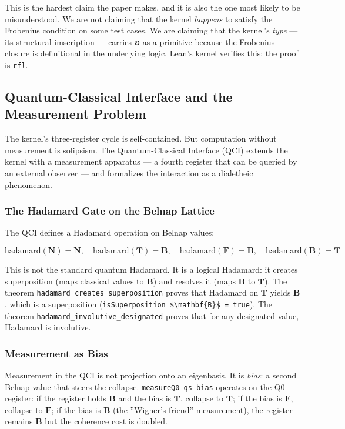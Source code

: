 \documentclass[10pt,a4paper]{article}
\begin{document}
This is the hardest claim the paper makes, and it is also the one most likely to be misunderstood. We are not claiming that the kernel \emph{happens} to satisfy the Frobenius condition on some test cases. We are claiming that the kernel's \emph{type} --- its structural imscription --- carries 𐑹 as a primitive because the Frobenius closure is definitional in the underlying logic. Lean's kernel verifies this; the proof is \texttt{rfl}.

\subsection{Quantum-Classical Interface and the Measurement Problem}

The kernel's three-register cycle is self-contained. But computation without measurement is solipsism. The Quantum-Classical Interface (QCI) extends the kernel with a measurement apparatus --- a fourth register that can be queried by an external observer --- and formalizes the interaction as a dialetheic phenomenon.

\subsubsection{The Hadamard Gate on the Belnap Lattice}

The QCI defines a Hadamard operation on Belnap values:

\[\text{hadamard}(\mathbf{N}) = \mathbf{N}, \quad \text{hadamard}(\mathbf{T}) = \mathbf{B}, \quad \text{hadamard}(\mathbf{F}) = \mathbf{B}, \quad \text{hadamard}(\mathbf{B}) = \mathbf{T}\]

This is not the standard quantum Hadamard. It is a logical Hadamard: it creates superposition (maps classical values to $\mathbf{B}$) and resolves it (maps $\mathbf{B}$ to $\mathbf{T}$). The theorem \texttt{hadamard\_\allowbreak creates\_\allowbreak superposition} proves that Hadamard on $\mathbf{T}$ yields $\mathbf{B}$, which is a superposition (\texttt{isSuperposition \$\textbackslash{}mathbf\{B\}\$ = true}). The theorem \texttt{hadamard\_\allowbreak involutive\_\allowbreak designated} proves that for any designated value, Hadamard is involutive.

\subsubsection{Measurement as Bias}

Measurement in the QCI is not projection onto an eigenbasis. It is \emph{bias}: a second Belnap value that steers the collapse. \texttt{measureQ0 qs bias} operates on the Q0 register: if the register holds $\mathbf{B}$ and the bias is $\mathbf{T}$, collapse to $\mathbf{T}$; if the bias is $\mathbf{F}$, collapse to $\mathbf{F}$; if the bias is $\mathbf{B}$ (the ''Wigner's friend'' measurement), the register remains $\mathbf{B}$ but the coherence cost is doubled.
\end{document}
